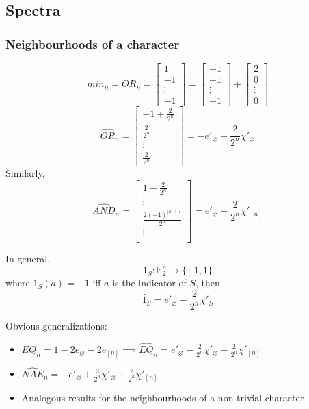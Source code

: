 \documentclass{sig-alternate}
\begin{document}
\subsection{Spectra}
\subsubsection {Neighbourhoods of a character}
\[ min_n = OR_n = \begin{bmatrix}
				1 \\
				-1 \\
				\vdots \\
				-1
				\end{bmatrix}
				 =
				 \begin{bmatrix}
				-1 \\
				-1 \\
				\vdots \\
				-1
				\end{bmatrix}
				+
				\begin{bmatrix}
				2 \\
				0 \\
				\vdots \\
				0
				\end{bmatrix}
				\]
\[ \widehat{OR}_n = \begin{bmatrix}
				-1 + \frac{2}{2^n}\\
				\frac{2}{2^n} \\
				\vdots \\
				\frac{2}{2^n}
				\end{bmatrix}
				= -e'_{\varnothing} + \frac{2}{2^n}\chi'_{\varnothing}
				\]
Similarly,
\[ \widehat{AND}_n = \begin{bmatrix}
				1 - \frac{2}{2^n}\\
				\vdots \\
				\frac{2(-1)^{|S| + 1}}{2^n} \\
				\vdots \\
				\end{bmatrix}
				= e'_{\varnothing} - \frac{2}{2^n}\chi'_{[n]}			
				\]

In general,				
\[ 1_{S}: \mathbb{F}_2^n \rightarrow \{-1,1\} \] where $1_S(a) = -1$ iff $a$ is the indicator of $S$, then
\[ \hat{1}_{S} = e'_{\varnothing} - \frac{2}{2^n}\chi'_S \]

Obvious generalizations:
\begin{itemize}
\item $EQ_n = 1 - 2e_{\varnothing} - 2e_{[n]} \implies \widehat{EQ}_n = e'_{\varnothing} - \frac{2}{2^n}\chi'_{\varnothing} - \frac{2}{2^n}\chi'_{[n]} $
\item $ \widehat{NAE}_n = -e'_{\varnothing} + \frac{2}{2^n}\chi'_{\varnothing} + \frac{2}{2^n}\chi'_{[n]} $
\item Analogous results for the neighbourhoods of a non-trivial character
\end{itemize}
\end{document}

